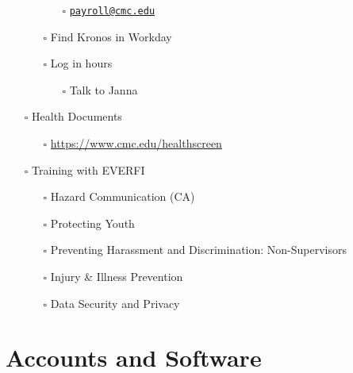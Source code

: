 \documentclass[
]{book}
\providecommand{\tightlist}{%
  \setlength{\itemsep}{0pt}\setlength{\parskip}{0pt}}
\begin{document}
\begin{itemize}
\begin{itemize}
    \begin{itemize}
    \tightlist
    \item[$\square$]
      \href{mailto:payroll@cmc.edu}{\nolinkurl{payroll@cmc.edu}}
    \end{itemize}
  \item[$\square$]
    Find Kronos in Workday
  \item[$\square$]
    Log in hours

    \begin{itemize}
    \tightlist
    \item[$\square$]
      Talk to Janna
    \end{itemize}
  \end{itemize}
\item[$\square$]
  Health Documents

  \begin{itemize}
  \tightlist
  \item[$\square$]
    \url{https://www.cmc.edu/healthscreen}
  \end{itemize}
\item[$\square$]
  Training with EVERFI

  \begin{itemize}
  \tightlist
  \item[$\square$]
    Hazard Communication (CA)
  \item[$\square$]
    Protecting Youth
  \item[$\square$]
    Preventing Harassment and Discrimination: Non-Supervisors
  \item[$\square$]
    Injury \& Illness Prevention
  \item[$\square$]
    Data Security and Privacy
  \end{itemize}
\end{itemize}

\hypertarget{accounts-and-software}{%
\chapter{Accounts and Software}\label{accounts-and-software}}
\end{document}
